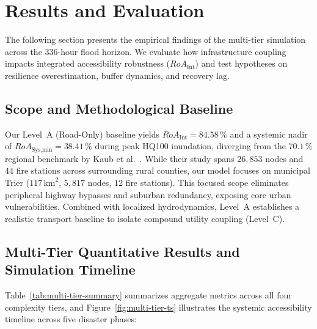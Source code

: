 
\newpage


\section{Results and Evaluation}
\label{sec:results-and-evaluation}


The following section presents the empirical findings of the multi-tier simulation across the 336-hour flood horizon.
We evaluate how infrastructure coupling impacts integrated accessibility robustness ($RoA_{\text{Int}}$) and test hypotheses on resilience overestimation, buffer dynamics, and recovery lag.

\subsection{Scope and Methodological Baseline}
\label{subsec:scope-and-baseline}

Our Level~A (Road-Only) baseline yields $RoA_{\text{Int}} = 84.58\,\%$ and a systemic nadir of $RoA_{\text{Sys,min}} = 38.41\,\%$ during peak HQ100 inundation, diverging from the $70.1\,\%$ regional benchmark by Kaub et al.~\cite{kaub2024}.
While their study spans $26{,}853$ nodes and $44$ fire stations across surrounding rural counties, our model focuses on municipal Trier ($117\,\text{km}^2$, $5{,}817$ nodes, $12$ fire stations).
This focused scope eliminates peripheral highway bypasses and suburban redundancy, exposing core urban vulnerabilities.
Combined with localized hydrodynamics, Level~A establishes a realistic transport baseline to isolate compound utility coupling (Level~C).

\subsection{Multi-Tier Quantitative Results and Simulation Timeline}
\label{subsec:quantitative-results}


Table~\ref{tab:multi-tier-summary} summarizes aggregate metrics across all four complexity tiers, and Figure~\ref{fig:multi-tier-ts} illustrates the systemic accessibility timeline across five disaster phases:


